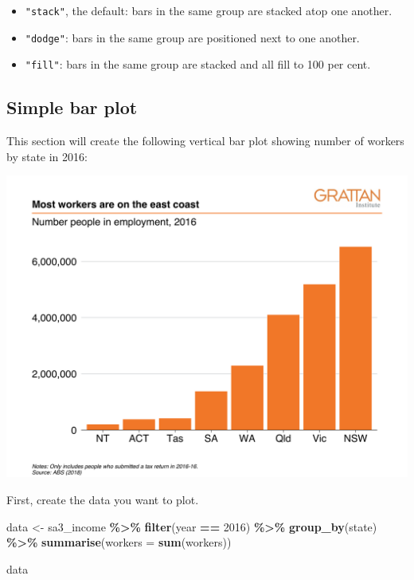 \documentclass[
]{book}
\newenvironment{Shaded}{\begin{snugshade}}{\end{snugshade}}
\newcommand{\DataTypeTok}[1]{\textcolor[rgb]{0.13,0.29,0.53}{#1}}
\newcommand{\DecValTok}[1]{\textcolor[rgb]{0.00,0.00,0.81}{#1}}
\newcommand{\KeywordTok}[1]{\textcolor[rgb]{0.13,0.29,0.53}{\textbf{#1}}}
\newcommand{\NormalTok}[1]{#1}
\newcommand{\OperatorTok}[1]{\textcolor[rgb]{0.81,0.36,0.00}{\textbf{#1}}}
\newcommand{\StringTok}[1]{\textcolor[rgb]{0.31,0.60,0.02}{#1}}
\providecommand{\tightlist}{%
  \setlength{\itemsep}{0pt}\setlength{\parskip}{0pt}}
\begin{document}
\begin{itemize}
\tightlist
\item
  \texttt{"stack"}, the default: bars in the same group are stacked atop one another.
\item
  \texttt{"dodge"}: bars in the same group are positioned next to one another.
\item
  \texttt{"fill"}: bars in the same group are stacked and all fill to 100 per cent.
\end{itemize}

\hypertarget{simple-bar-plot}{%
\subsection{Simple bar plot}\label{simple-bar-plot}}

This section will create the following vertical bar plot showing number of workers by state in 2016:

\includegraphics[width=44.44in]{atlas/simple_bar}

First, create the data you want to plot.

\begin{Shaded}
\begin{Highlighting}[]
\NormalTok{data \textless{}{-}}\StringTok{ }\NormalTok{sa3\_income }\OperatorTok{\%\textgreater{}\%}\StringTok{ }
\StringTok{  }\KeywordTok{filter}\NormalTok{(year }\OperatorTok{==}\StringTok{ }\DecValTok{2016}\NormalTok{) }\OperatorTok{\%\textgreater{}\%}\StringTok{ }
\StringTok{  }\KeywordTok{group\_by}\NormalTok{(state) }\OperatorTok{\%\textgreater{}\%}\StringTok{ }
\StringTok{  }\KeywordTok{summarise}\NormalTok{(}\DataTypeTok{workers =} \KeywordTok{sum}\NormalTok{(workers))}

\NormalTok{data}
\end{Highlighting}
\end{Shaded}
\end{document}
